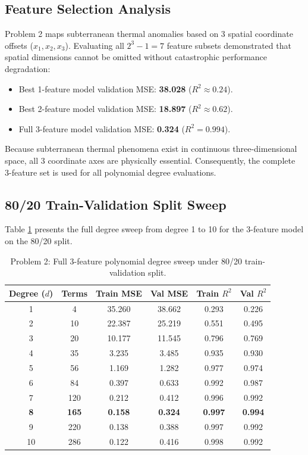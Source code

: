 \documentclass[12pt]{article}
\begin{document}
\subsection{Feature Selection Analysis}
Problem 2 maps subterranean thermal anomalies based on 3 spatial coordinate offsets ($x_1, x_2, x_3$). Evaluating all $2^3 - 1 = 7$ feature subsets demonstrated that spatial dimensions cannot be omitted without catastrophic performance degradation:
\begin{itemize}
    \item Best 1-feature model validation MSE: \textbf{38.028} ($R^2 \approx 0.24$).
    \item Best 2-feature model validation MSE: \textbf{18.897} ($R^2 \approx 0.62$).
    \item Full 3-feature model validation MSE: \textbf{0.324} ($R^2 = 0.994$).
\end{itemize}
Because subterranean thermal phenomena exist in continuous three-dimensional space, all 3 coordinate axes are physically essential. Consequently, the complete 3-feature set is used for all polynomial degree evaluations.

\subsection{80/20 Train-Validation Split Sweep}
Table \ref{tab:var2_8020} presents the full degree sweep from degree 1 to 10 for the 3-feature model on the 80/20 split.

\begin{table}[h]
\centering
\begin{tabular}{c c c c c c}
\toprule
\textbf{Degree ($d$)} & \textbf{Terms} & \textbf{Train MSE} & \textbf{Val MSE} & \textbf{Train $R^2$} & \textbf{Val $R^2$} \\
\midrule
1 & 4   & 35.260 & 38.662 & 0.293 & 0.226 \\
2 & 10  & 22.387 & 25.219 & 0.551 & 0.495 \\
3 & 20  & 10.177 & 11.545 & 0.796 & 0.769 \\
4 & 35  & 3.235  & 3.485  & 0.935 & 0.930 \\
5 & 56  & 1.169  & 1.282  & 0.977 & 0.974 \\
6 & 84  & 0.397  & 0.633  & 0.992 & 0.987 \\
7 & 120 & 0.212  & 0.412  & 0.996 & 0.992 \\
\textbf{8} & \textbf{165} & \textbf{0.158} & \textbf{0.324} & \textbf{0.997} & \textbf{0.994} \\
9 & 220 & 0.138  & 0.388  & 0.997 & 0.992 \\
10 & 286 & 0.122 & 0.416  & 0.998 & 0.992 \\
\bottomrule
\end{tabular}
\caption{Problem 2: Full 3-feature polynomial degree sweep under 80/20 train-validation split.}
\label{tab:var2_8020}
\end{table}
\end{document}
